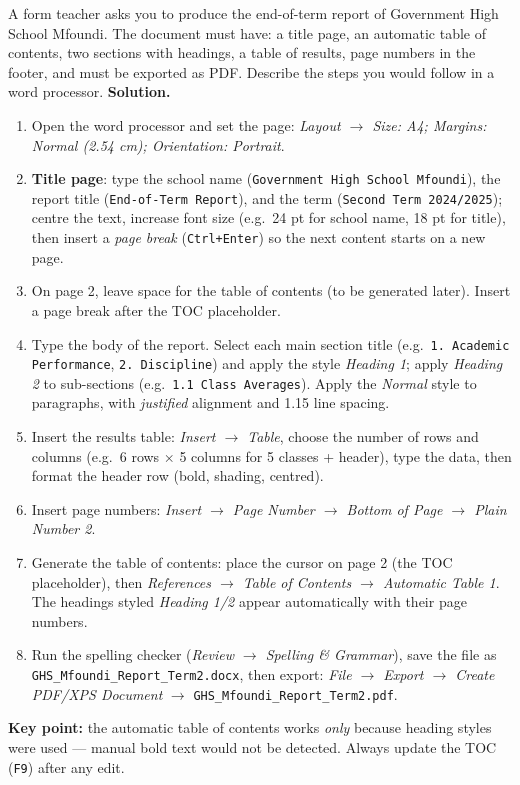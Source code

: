 \documentclass[11pt]{article}
\begin{document}
\begin{exoresolu}
A form teacher asks you to produce the end-of-term report of Government High School Mfoundi. The document must have: a title page, an automatic table of contents, two sections with headings, a table of results, page numbers in the footer, and must be exported as PDF. Describe the steps you would follow in a word processor.
\tcblower
\textbf{Solution.}
\begin{enumerate}
\item Open the word processor and set the page: \emph{Layout $\rightarrow$ Size: A4; Margins: Normal (2.54 cm); Orientation: Portrait}.
\item \textbf{Title page}: type the school name (\texttt{Government High School Mfoundi}), the report title (\texttt{End-of-Term Report}), and the term (\texttt{Second Term 2024/2025}); centre the text, increase font size (e.g.\ 24 pt for school name, 18 pt for title), then insert a \emph{page break} (\texttt{Ctrl+Enter}) so the next content starts on a new page.
\item On page 2, leave space for the table of contents (to be generated later). Insert a page break after the TOC placeholder.
\item Type the body of the report. Select each main section title (e.g.\ \texttt{1. Academic Performance}, \texttt{2. Discipline}) and apply the style \emph{Heading 1}; apply \emph{Heading 2} to sub-sections (e.g.\ \texttt{1.1 Class Averages}). Apply the \emph{Normal} style to paragraphs, with \emph{justified} alignment and 1.15 line spacing.
\item Insert the results table: \emph{Insert $\rightarrow$ Table}, choose the number of rows and columns (e.g.\ 6 rows $\times$ 5 columns for 5 classes + header), type the data, then format the header row (bold, shading, centred).
\item Insert page numbers: \emph{Insert $\rightarrow$ Page Number $\rightarrow$ Bottom of Page $\rightarrow$ Plain Number 2}.
\item Generate the table of contents: place the cursor on page 2 (the TOC placeholder), then \emph{References $\rightarrow$ Table of Contents $\rightarrow$ Automatic Table 1}. The headings styled \emph{Heading 1/2} appear automatically with their page numbers.
\item Run the spelling checker (\emph{Review $\rightarrow$ Spelling \& Grammar}), save the file as \texttt{GHS\_Mfoundi\_Report\_Term2.docx}, then export: \emph{File $\rightarrow$ Export $\rightarrow$ Create PDF/XPS Document} $\rightarrow$ \texttt{GHS\_Mfoundi\_Report\_Term2.pdf}.
\end{enumerate}
\textbf{Key point:} the automatic table of contents works \emph{only} because heading styles were used --- manual bold text would not be detected. Always update the TOC (\texttt{F9}) after any edit.
\end{exoresolu}
\end{document}
